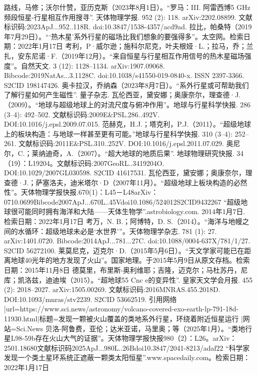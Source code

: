 \begin{enumerate}
 路线，马修；沃尔什赞，亚历克斯（2023年8月1日）。“罗马：III. 阿雷西博5 GHz频段恒星-行星相互作用搜寻”. 天体物理学报. 952 (2): 118. arXiv:2202.08899. 文献标识码:2023ApJ...952..118R. doi:10.3847/1538-4357/acd9ad.
 拉比，帕桑特（2019年7月29日）。“‘热木星’系外行星的磁场比我们想象的要强得多”。太空网。检索日期：2022年1月17日
 考利，P·威尔逊；施科尔尼克，叶夫根娅·L.；拉马，乔；兰扎，安东尼诺·F.（2019年12月）。“来自恒星与行星相互作用信号的热木星磁场强度”。自然天文. 3 (12): 1128–1134. arXiv:1907.09068. Bibcode:2019NatAs...3.1128C. doi:10.1038/s41550-019-0840-x. ISSN 2397-3366. S2CID 198147426.
 奥卡拉汉，乔纳森（2023年8月7日）。“系外行星或可帮助我们了解行星如何产生磁性”. 量子杂志.
 瓦伦西亚，黛安娜；奥康奈尔，理查德·J.（2009）。“地球与超级地球上的对流尺度与俯冲作用”。地球与行星科学快报. 286 (3–4): 492–502. 文献标识码:2009E&PSL.286..492V. DOI:10.1016/j.epsl.2009.07.015.
 范赫克，H.J.；塔克利，P.J.（2011）。“超级地球上的板块构造：与地球一样甚至更有可能。”地球与行星科学快报. 310 (3–4): 252–261. 文献标识码:2011E&PSL.310..252V. DOI:10.1016/j.epsl.2011.07.029.
 奥尼尔，C.；莱纳迪奇，A.（2007）。“超大地球的地质后果”. 地球物理研究快报. 34（19）：L19204。文献标识码:2007GeoRL..3419204O. DOI:10.1029/2007GL030598. S2CID 41617531.
 瓦伦西亚，黛安娜；奥康奈尔，理查德·J.；萨塞洛夫，迪米塔尔·D（2007年11月）。“超级地球上板块构造的必然性”。天体物理学报快报.670(1)：L45－L48arXiv：0710.0699Bibcode2007ApJ...670L..45Vdoi10.1086/524012S2CID9432267
 “超级地球很可能同时拥有海洋和大陆——天体生物学”.astrobiology.com. 2014年1月7日. 检索日期：2022年1月17日
 考万，N. B.；阿博特，D. S.（2014）。“海洋与地幔之间的水循环：超级地球未必是‘水世界’”。天体物理学杂志. 781 (1): 27. arXiv:1401.0720. Bibcode:2014ApJ...781...27C. doi:10.1088/0004-637X/781/1/27. S2CID 56272100.
 莱莫尼克，迈克尔·D.（2015年5月6日）。“天文学家可能已在距离地球40光年的地方发现了火山”。国家地理。于2015年5月9日从原文存档。检索日期：2015年11月8日
 德莫里，布里斯-奥利维耶；吉隆，迈克尔；马杜苏丹，尼库；凯洛兹，迪迪埃（2015）。“超地球55 Cnc e的变异性”. 皇家天文学会月报. 455 (2): 2018–2027. arXiv:1505.00269. 文献标识码:2016MNRAS.455.2018D. DOI:10.1093/mnras/stv2239. S2CID 53662519.
 {{引用网络 |url=https://www.sci.news/astronomy/volcano-covered-exo-earth-lp-791-18d-11930.html|标题=发现一颗被火山覆盖的类地系外行星，环绕着附近恒星运行 |网站=Sci.News}}
 贝洛-阿鲁费，亚伦；达米亚诺，马里奥；等（2025年1月）。“类地行星L98-59b存在火山大气的证据”。天体物理学报快报980（2）：L26。arXiv：2501.18680文献标识码2025ApJ...980L..26Bdoi10.3847/2041-8213/adaf22
 “科学家发现一个类土星环系统正遮蔽一颗类太阳恒星”.www.spacedaily.com。检索日期：2022年1月17日

\end{enumerate}
